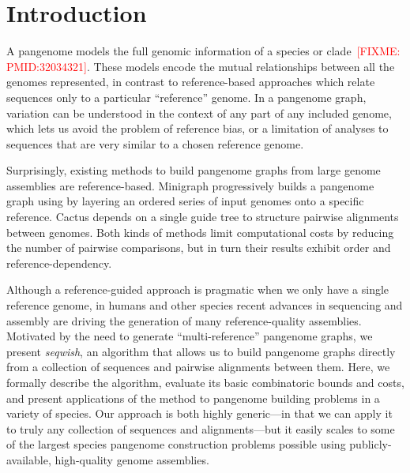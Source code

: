 \documentclass{bioinfo}
\newcommand{\red}[1]{{\textcolor{Red}{#1}}}
\newcommand{\FIXME}[1]{\red{[FIXME: #1]}}
\begin{document}
\maketitle


\section{Introduction}
\label{sec:introduction}
A pangenome models the full genomic information of a species or clade~\FIXME{PMID:32034321}.
These models encode the mutual relationships between all the genomes represented, in contrast to reference-based approaches which relate sequences only to a particular ``reference'' genome.
In a pangenome graph, variation can be understood in the context of any part of any included genome, which lets us avoid the problem of reference bias, or a limitation of analyses to sequences that are very similar to a chosen reference genome.

Surprisingly, existing methods to build pangenome graphs from large genome assemblies are reference-based.
Minigraph progressively builds a pangenome graph using by layering an ordered series of input genomes onto a specific reference.
Cactus depends on a single guide tree to structure pairwise alignments between genomes.
Both kinds of methods limit computational costs by reducing the number of pairwise comparisons, but in turn their results exhibit order and reference-dependency.

Although a reference-guided approach is pragmatic when we only have a single reference genome, in humans and other species recent advances in sequencing and assembly are driving the generation of many reference-quality assemblies.
Motivated by the need to generate ``multi-reference'' pangenome graphs, we present \textit{seqwish}, an algorithm that allows us to build pangenome graphs directly from a collection of sequences and pairwise alignments between them.
Here, we formally describe the algorithm, evaluate its basic combinatoric bounds and costs, and present applications of the method to pangenome building problems in a variety of species.
Our approach is both highly generic---in that we can apply it to truly any collection of sequences and alignments---but it easily scales to some of the largest species pangenome construction problems possible using publicly-available, high-quality genome assemblies.
\end{document}

